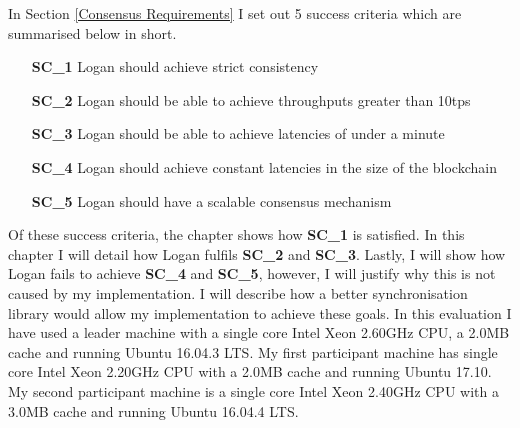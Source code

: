 \documentclass[12pt,a4paper,twoside,openright]{report}
\begin{document}
	\noindent In Section \ref{Consensus Requirements} I set out 5 success criteria which are summarised below in short. 
	\begin{itemize}
		\setlength{\itemindent}{2em}
		\item[\textbf{SC\_1}] Logan should achieve strict consistency
		\item[\textbf{SC\_2}] Logan should be able to achieve throughputs greater than 10tps
		\item[\textbf{SC\_3}] Logan should be able to achieve latencies of under a minute
		\item[\textbf{SC\_4}] Logan should achieve constant latencies in the size of the blockchain
		\item[\textbf{SC\_5}] Logan should have a scalable consensus mechanism 
	\end{itemize}
	Of these success criteria, the  chapter shows how \textbf{SC\_1} is satisfied.
	In this chapter I will detail how Logan fulfils \textbf{SC\_2} and \textbf{SC\_3}.
	Lastly, I will show how Logan fails to achieve \textbf{SC\_4} and \textbf{SC\_5}, however, I will justify why this is not caused by my implementation.
	I will describe how a better synchronisation library would allow my implementation to achieve these goals.
	In this evaluation I have used a leader machine with a single core Intel Xeon 2.60GHz CPU, a 2.0MB cache and running Ubuntu 16.04.3 LTS. 
	My first participant machine has single core Intel Xeon 2.20GHz CPU with a 2.0MB cache and running Ubuntu 17.10.
	My second participant machine is a single core Intel Xeon 2.40GHz CPU with a 3.0MB cache and running Ubuntu 16.04.4 LTS.
\end{document}
